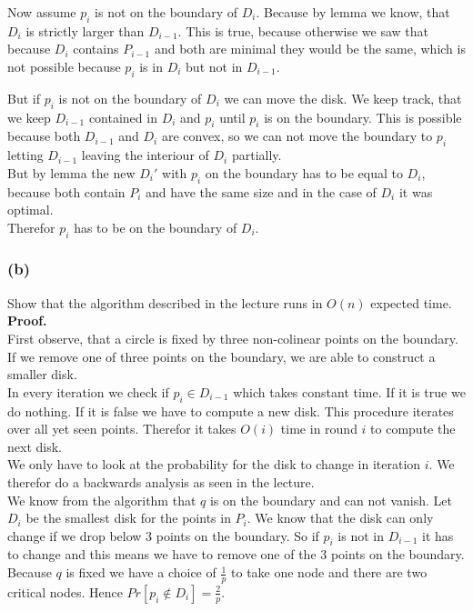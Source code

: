 \documentclass[11pt,a4paper,ngerman]{article}
\begin{document}
Now assume $p_i$ is not on the boundary of $D_i$. Because by lemma we know, that $D_i$ is strictly larger than $D_{i-1}$.
This is true, because otherwise we saw that because $D_i$ contains $P_{i-1}$ and both are minimal they would be the
same, which is not possible because $p_i$ is in $D_i$ but not in $D_{i-1}$.

But if $p_i$ is not on the boundary of $D_i$ we can move the disk. We keep track, that we keep $D_{i-1}$ contained in $D_{i}$
and $p_i$ until $p_i$ is on the boundary. This is possible because both $D_{i-1}$ and $D_i$ are convex, so we can not move the
boundary to $p_i$ letting $D_{i-1}$ leaving the interiour of $D_i$ partially.\\

But by lemma the new $D_i'$ with $p_i$ on the boundary has to be equal to $D_i$, because both contain $P_i$ and have the same
size and in the case of $D_i$ it was optimal.\\

Therefor $p_i$ has to be on the boundary of $D_i$.

\subsubsection*{(b)}
Show that the algorithm described in the lecture runs in $O(n)$ expected time.\\

\textbf{Proof.}\\

First observe, that a circle is fixed by three non-colinear points on the boundary. If we remove one of 
three points on the boundary, we are able to construct a smaller disk.\\

In every iteration we check if $p_i \in D_{i-1}$ which takes constant time.
If it is true we do nothing. If it is false we have to compute a new disk. This
procedure iterates over all yet seen points. Therefor it takes $O(i)$ time in round $i$
to compute the next disk.\\

We only have to look at the probability for the disk to change in iteration $i$. We therefor
do a backwards analysis as seen in the lecture.\\

We know from the algorithm that $q$ is on the boundary and can not vanish. Let $D_i$ be
the smallest disk for the points in $P_i$. We know that the disk can only change if we drop
below 3 points on the boundary. So if $p_i$ is not in $D_{i-1}$ it has to change
and this means we have to remove one of the 3 points on the boundary. Because $q$ is fixed
we have a choice of $\frac{1}{p}$ to take one node and there are two critical nodes.
Hence $Pr[p_i \not\in D_i] = \frac{2}{p}$.\\
\end{document}
